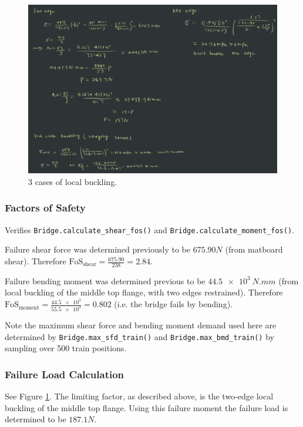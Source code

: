 \documentclass{article}
\begin{document}
\begin{figure}[H]
    \centering
    \includegraphics[width=\textwidth]{localbuckling.png}
    \caption{3 cases of local buckling.}
    \label{fig:local_buckling}
\end{figure}

\subsubsection{Factors of Safety}

Verifies \texttt{Bridge.calculate_shear_fos()} and \texttt{Bridge.calculate_moment_fos()}.

Failure shear force was determined previously to be \(675.90\si{N}\) (from matboard shear). Therefore
\(\text{FoS}_{\text{shear}} = \frac{675.90}{238} = 2.84\).

Failure bending moment was determined previous to be
\(\SI{44.5e3}{N.mm}\) (from local buckling of the middle top flange, with two edges restrained). Therefore
\(\text{FoS}_{\text{moment}} = \frac{\num{44.5e3}}{\num{55.5e3}} = 0.802\) (i.e. the bridge fails by bending).

Note the maximum shear force and bending moment demand used here are determined by
\texttt{Bridge.max_sfd_train()} and \texttt{Bridge.max_bmd_train()} by sampling over 500 train
positions.

\subsubsection{Failure Load Calculation}

See Figure \ref{fig:local_buckling}. The limiting factor, as described above, is the two-edge local buckling of the middle top
flange. Using this failure moment the failure load is determined to be \(187.1\si{N}\).
\end{document}
